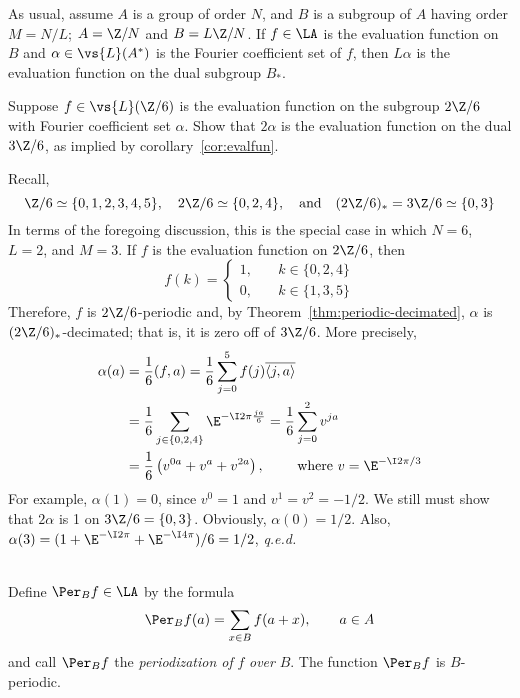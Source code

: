 \begin{corollary}\label{cor:evalfun}
As usual, assume $A$ is a group of order $N$, and $B$ is a subgroup of $A$
having order $M = N/L$; \eg $A = \Z/N$ and $B=L\Z/N$. If $f \in \LA$ is the
evaluation function on $B$ and 
$\alpha \in \vs{L}(A^*)$ is the Fourier coefficient set of $f$, then $L\alpha$ is
the evaluation function on the dual subgroup $B_*$.
\end{corollary}
\begin{exercise}  Suppose $f \in \vs{L}(\Z/6)$ is the evaluation function on the
  subgroup $2\Z/6$ with Fourier coefficient set $\alpha$.  Show that
  $2\alpha$ is the evaluation function on the dual $3\Z/6$, as implied by
  corollary~\ref{cor:evalfun}.
\end{exercise} 
\begin{solution}
Recall,
\[ 
\Z/6 \simeq \{0,1,2,3,4,5\},\quad 2\Z/6 \simeq \{0,2,4\},
\quad \text{and} \quad (2\Z/6)_* = 3\Z/6 \simeq \{0,3\}
\]
In terms of the foregoing discussion, this is the special case in which
$N=6$, $L=2$, and $M=3$. If $f$ is the evaluation function on  $2\Z/6$, then
\[
f(k) = \left\{ \begin{array}{ll}
1, & \quad k\in \{0,2,4\}\\
0, & \quad k\in \{1,3,5\}
\end{array}
\right.
\]
Therefore, $f$ is $2\Z/6$-periodic and, by
Theorem~\ref{thm:periodic-decimated}, $\alpha$ is $(2\Z/6)_*$-decimated;
that is, it is zero off of $3\Z/6$.  More precisely,
\begin{align*}
\alpha(a) & = \frac{1}{6}(f,a)= \frac{1}{6} \sum_{j=0}^5 f(j)\overline{\langle j,a\rangle} \\
&= \frac{1}{6} \sum_{j\in\{0,2,4\}}\E^{-\I 2 \pi \frac{ja}{6}}
= \frac{1}{6} \sum_{j=0}^2 v^{ja}\\
&= \frac{1}{6} \left( v^{0a} +  v^{a} +  v^{2a} \right), \qquad \text{ where } v = \E^{-\I 2 \pi/3}
\end{align*}
For example, $\alpha(1) = 0$, since $v^0 = 1$ and $v^1 = v^2 = -1/2$.
We still must show that $2\alpha$ is 1 on $3\Z/6 = \{0,3\}$. Obviously,
$\alpha(0) =1/2$.  Also, $\alpha(3) = (1 +  \E^{-\I 2 \pi} + \E^{-\I 4 \pi})/6 =
1/2$, {\it q.e.d.}
\end{solution}

\begin{definition}[Periodization]\\
Define $\Per_B f\in \LA$ by the formula 
\[
\Per_B f(a) = \sum_{x\in B} f(a+x), \qquad a\in A
\]
and call $\Per_B f$ the \emph{periodization of} $f$ \emph{over} $B$.  The function 
$\Per_B f$ is $B$-periodic.
\end{definition}

